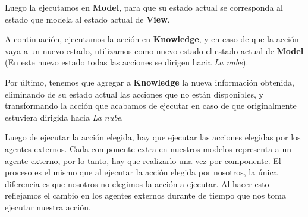 Luego la ejecutamos en \textbf{Model}, para que su estado actual se corresponda al estado que modela al estado actual de \textbf{View}.


A continuación, ejecutamos la acción en \textbf{Knowledge}, y en caso de que la acción vaya a un nuevo estado, utilizamos como nuevo estado el estado actual 
de \textbf{Model} (En este nuevo estado todas las acciones se dirigen hacia \textit{La nube}).


Por último, tenemos que agregar a \textbf{Knowledge} la nueva información obtenida, eliminando de su estado actual las acciones que no están disponibles, y 
transformando la acción que acabamos de ejecutar en caso de que originalmente estuviera dirigida hacia \textit{La nube}.


Luego de ejecutar la acción elegida, hay que ejecutar las acciones elegidas por los agentes externos. Cada componente extra en nuestros modelos representa a un agente 
externo, por lo tanto, hay que realizarlo una vez por componente. El proceso es el mismo que al ejecutar la acción elegida por nosotros, la única diferencia es que 
nosotros no elegimos la acción a ejecutar. Al hacer esto reflejamos el cambio en los agentes externos durante de tiempo que nos toma ejecutar nuestra acción.